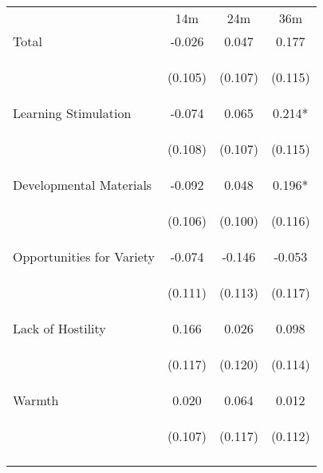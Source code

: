 \begin{tabular}{lccc}
\hline \noalign{\smallskip} & 14m & 24m & 36m\\
\noalign{\smallskip}\hline \noalign{\smallskip}Total & -0.026 & 0.047 & 0.177\\
 & \begin{footnotesize}(0.105)\end{footnotesize} & \begin{footnotesize}(0.107)\end{footnotesize} & \begin{footnotesize}(0.115)\end{footnotesize}\\
\noalign{\smallskip}Learning Stimulation & -0.074 & 0.065 & 0.214*\\
 & \begin{footnotesize}(0.108)\end{footnotesize} & \begin{footnotesize}(0.107)\end{footnotesize} & \begin{footnotesize}(0.115)\end{footnotesize}\\
\noalign{\smallskip}Developmental Materials & -0.092 & 0.048 & 0.196*\\
 & \begin{footnotesize}(0.106)\end{footnotesize} & \begin{footnotesize}(0.100)\end{footnotesize} & \begin{footnotesize}(0.116)\end{footnotesize}\\
\noalign{\smallskip}Opportunities for Variety & -0.074 & -0.146 & -0.053\\
 & \begin{footnotesize}(0.111)\end{footnotesize} & \begin{footnotesize}(0.113)\end{footnotesize} & \begin{footnotesize}(0.117)\end{footnotesize}\\
\noalign{\smallskip}Lack of Hostility & 0.166 & 0.026 & 0.098\\
 & \begin{footnotesize}(0.117)\end{footnotesize} & \begin{footnotesize}(0.120)\end{footnotesize} & \begin{footnotesize}(0.114)\end{footnotesize}\\
\noalign{\smallskip}Warmth & 0.020 & 0.064 & 0.012\\
 & \begin{footnotesize}(0.107)\end{footnotesize} & \begin{footnotesize}(0.117)\end{footnotesize} & \begin{footnotesize}(0.112)\end{footnotesize}\\
\noalign{\smallskip}\hline\end{tabular}\\

